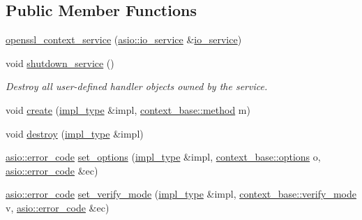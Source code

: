 \subsection*{Public Member Functions}
\begin{DoxyCompactItemize}
\item 
\hyperlink{classasio_1_1ssl_1_1old_1_1detail_1_1openssl__context__service_a4a03a8d0e251f4a47ff2a4fab4e154c5}{openssl\+\_\+context\+\_\+service} (\hyperlink{classasio_1_1io__service}{asio\+::io\+\_\+service} \&\hyperlink{classasio_1_1io__service}{io\+\_\+service})
\item 
void \hyperlink{classasio_1_1ssl_1_1old_1_1detail_1_1openssl__context__service_a17c687913234420ef7f14e9073bd2267}{shutdown\+\_\+service} ()
\begin{DoxyCompactList}\small\item\em Destroy all user-\/defined handler objects owned by the service. \end{DoxyCompactList}\item 
void \hyperlink{classasio_1_1ssl_1_1old_1_1detail_1_1openssl__context__service_a68008abf9f1214ed0401d83628332fc4}{create} (\hyperlink{classasio_1_1ssl_1_1old_1_1detail_1_1openssl__context__service_a1287914e0f48a9098c9141ca33ecd570}{impl\+\_\+type} \&impl, \hyperlink{classasio_1_1ssl_1_1context__base_ac37d498266e3b13607f011ace6417525}{context\+\_\+base\+::method} m)
\item 
void \hyperlink{classasio_1_1ssl_1_1old_1_1detail_1_1openssl__context__service_a923e8c742e510d932326a5be8f1446ff}{destroy} (\hyperlink{classasio_1_1ssl_1_1old_1_1detail_1_1openssl__context__service_a1287914e0f48a9098c9141ca33ecd570}{impl\+\_\+type} \&impl)
\item 
\hyperlink{classasio_1_1error__code}{asio\+::error\+\_\+code} \hyperlink{classasio_1_1ssl_1_1old_1_1detail_1_1openssl__context__service_a301c3fa08a7a7852996fd33f225f8092}{set\+\_\+options} (\hyperlink{classasio_1_1ssl_1_1old_1_1detail_1_1openssl__context__service_a1287914e0f48a9098c9141ca33ecd570}{impl\+\_\+type} \&impl, \hyperlink{classasio_1_1ssl_1_1context__base_a12d5d28abeb47c91311bf13740dec514}{context\+\_\+base\+::options} o, \hyperlink{classasio_1_1error__code}{asio\+::error\+\_\+code} \&ec)
\item 
\hyperlink{classasio_1_1error__code}{asio\+::error\+\_\+code} \hyperlink{classasio_1_1ssl_1_1old_1_1detail_1_1openssl__context__service_a0e2e4bb558b6bd6355c28aa080afdc1d}{set\+\_\+verify\+\_\+mode} (\hyperlink{classasio_1_1ssl_1_1old_1_1detail_1_1openssl__context__service_a1287914e0f48a9098c9141ca33ecd570}{impl\+\_\+type} \&impl, \hyperlink{classasio_1_1ssl_1_1context__base_aa9ef38ba747dd4e8ecb1f9a279a67d6b}{context\+\_\+base\+::verify\+\_\+mode} v, \hyperlink{classasio_1_1error__code}{asio\+::error\+\_\+code} \&ec)

\end{DoxyCompactItemize}
